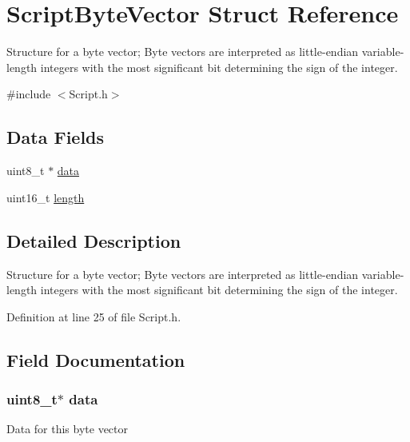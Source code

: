 \hypertarget{struct_script_byte_vector}{
\section{ScriptByteVector Struct Reference}
\label{struct_script_byte_vector}
}


Structure for a byte vector; Byte vectors are interpreted as little-\/endian variable-\/length integers with the most significant bit determining the sign of the integer.  




{\ttfamily \#include $<$Script.h$>$}

\subsection*{Data Fields}
\begin{DoxyCompactItemize}
\item 
uint8\_\-t $\ast$ \hyperlink{struct_script_byte_vector_abe222f6d3581e7920dcad5306cc906a8}{data}
\item 
uint16\_\-t \hyperlink{struct_script_byte_vector_a1892eba2086d12ac2b09005aeb09ea3b}{length}
\end{DoxyCompactItemize}


\subsection{Detailed Description}
Structure for a byte vector; Byte vectors are interpreted as little-\/endian variable-\/length integers with the most significant bit determining the sign of the integer. 

Definition at line 25 of file Script.h.



\subsection{Field Documentation}
\hypertarget{struct_script_byte_vector_abe222f6d3581e7920dcad5306cc906a8}{
\subsubsection[{data}]{\setlength{\rightskip}{0pt plus 5cm}uint8\_\-t$\ast$ {\bf data}}}
\label{struct_script_byte_vector_abe222f6d3581e7920dcad5306cc906a8}
Data for this byte vector 

